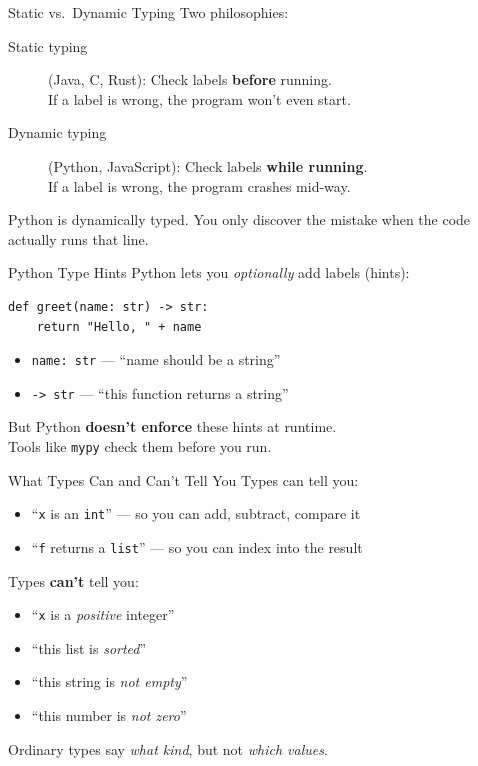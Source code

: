 \documentclass[aspectratio=169,10pt]{beamer}
\newcommand{\hint}[1]{\begin{center}
  \colorbox{hintbg}{\parbox{0.88\textwidth}{\centering\small #1}}\end{center}}
\newcommand{\warn}[1]{\begin{center}
  \colorbox{warnbg}{\parbox{0.88\textwidth}{\centering\small #1}}\end{center}}
\begin{document}
\begin{frame}{Static vs.\ Dynamic Typing}
Two philosophies:
\vspace{0.3em}
\begin{description}
  \item[Static typing] (Java, C, Rust): Check labels \textbf{before} running.\\
    If a label is wrong, the program won't even start.
  \item[Dynamic typing] (Python, JavaScript): Check labels \textbf{while running}.\\
    If a label is wrong, the program crashes mid-way.
\end{description}
\vspace{0.3em}
\hint{Python is dynamically typed. You only discover the mistake when the code actually runs that line.}
\end{frame}

\begin{frame}[fragile]{Python Type Hints}
Python lets you \emph{optionally} add labels (hints):
\begin{lstlisting}
def greet(name: str) -> str:
    return "Hello, " + name
\end{lstlisting}
\vspace{0.3em}
\begin{itemize}
  \item \texttt{name: str} — ``name should be a string''
  \item \texttt{-> str} — ``this function returns a string''
\end{itemize}
But Python \textbf{doesn't enforce} these hints at runtime.\\
Tools like \texttt{mypy} check them before you run.
\end{frame}

\begin{frame}[fragile]{What Types Can and Can't Tell You}
Types can tell you:
\begin{itemize}
  \item ``\texttt{x} is an \texttt{int}'' — so you can add, subtract, compare it
  \item ``\texttt{f} returns a \texttt{list}'' — so you can index into the result
\end{itemize}
\vspace{0.3em}
Types \textbf{can't} tell you:
\begin{itemize}
  \item ``\texttt{x} is a \emph{positive} integer''
  \item ``this list is \emph{sorted}''
  \item ``this string is \emph{not empty}''
  \item ``this number is \emph{not zero}''
\end{itemize}
\warn{Ordinary types say \emph{what kind}, but not \emph{which values}.}
\end{frame}
\end{document}
